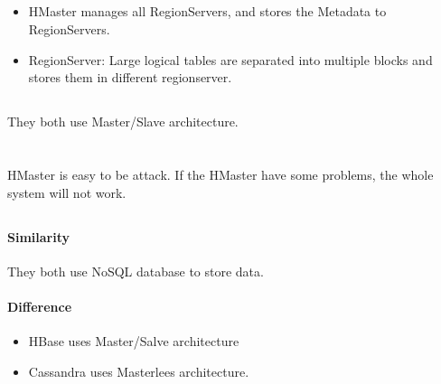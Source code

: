 \documentclass{article}
\begin{document}
        \subsection{}
            \paragraph{}
            \begin{itemize}
                \item HMaster manages all RegionServers, and stores the Metadata to RegionServers.
                \item RegionServer: Large logical tables are separated into multiple blocks and stores them in different regionserver.
            \end{itemize}
        \subsection{}
            \paragraph{}
            They both use Master/Slave architecture. 
    \section{}
        \subsection{}
            \paragraph{}
            HMaster is easy to be attack. If the HMaster have some problems, the whole system will not work.
        \subsection{}
            \paragraph{Similarity}
            They both use NoSQL database to store data.
            \paragraph{Difference}
            \begin{itemize}
                \item HBase uses Master/Salve architecture
                \item Cassandra uses Masterlees architecture.
            \end{itemize}
\end{document}
